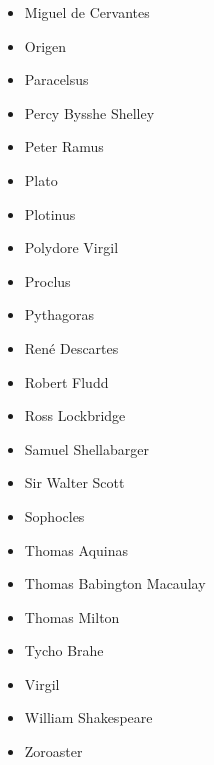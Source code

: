 \documentclass[12pt]{article}
\begin{document}
\begin{itemize}
  Mary Norton
\item
  Miguel de Cervantes
\item
  Origen
\item
  Paracelsus
\item
  Percy Bysshe Shelley
\item
  Peter Ramus
\item
  Plato
\item
  Plotinus
\item
  Polydore Virgil
\item
  Proclus
\item
  Pythagoras
\item
  René Descartes
\item
  Robert Fludd
\item
  Ross Lockbridge
\item
  Samuel Shellabarger
\item
  Sir Walter Scott
\item
  Sophocles
\item
  Thomas Aquinas
\item
  Thomas Babington Macaulay
\item
  Thomas Milton
\item
  Tycho Brahe
\item
  Virgil
\item
  William Shakespeare
\item
  Zoroaster
\end{itemize}

\end{document}
